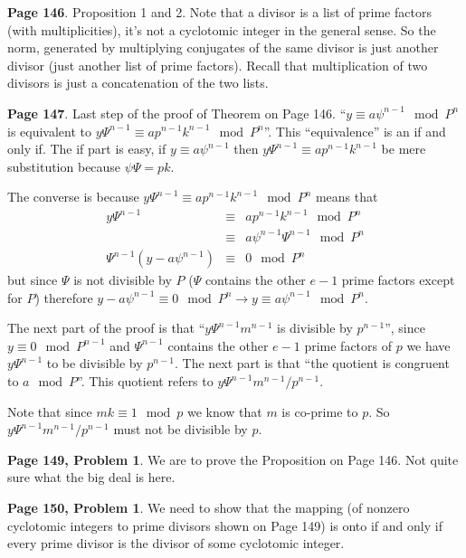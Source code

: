 \documentclass[aps,preprint,preprintnumbers,nofootinbib,showpacs,prd]{revtex4-1}
\newcommand{\nbea}{\begin{eqnarray*}}
\newcommand{\neea}{\end{eqnarray*}}
\begin{document}
{\bf Page 146}. Proposition 1 and 2. Note that a divisor is a list of prime factors (with multiplicities), it's not a cyclotomic integer in the general sense. So the norm, generated by multiplying conjugates of the same divisor is just another divisor (just another list of prime factors). Recall that multiplication of two divisors is just a concatenation of the two lists.


{\bf Page 147}. Last step of the proof of Theorem on Page 146. ``$y \equiv a\psi^{n-1} \mod P^n$ is equivalent to $y\Psi^{n-1} \equiv ap^{n-1}k^{n-1} \mod P^n$''. This ``equivalence'' is an if and only if. The if part is easy, if $y \equiv a\psi^{n-1}$ then $y\Psi^{n-1} \equiv ap^{n-1}k^{n-1}$ be mere substitution because $\psi\Psi = pk$.

The converse is because $y\Psi^{n-1} \equiv ap^{n-1}k^{n-1} \mod P^n$ means that 
%
\nbea
y\Psi^{n-1} & \equiv & ap^{n-1}k^{n-1} \mod P^n \\
& \equiv & a\psi^{n-1}\Psi^{n-1} \mod P^n \\
\Psi^{n-1}(y - a\psi^{n-1}) & \equiv & 0 \mod P^n
\neea
%
but since $\Psi$ is not divisible by $P$ ($\Psi$ contains the other $e - 1$ prime factors except for $P$) therefore $y - a\psi^{n-1} \equiv 0 \mod P^n \to y \equiv a\psi^{n-1} \mod P^n$.

The next part of the proof is that ``$y\Psi^{n-1}m^{n-1}$ is divisible by $p^{n-1}$'', since $y \equiv 0 \mod P^{n-1}$ and $\Psi^{n-1}$ contains the other $e - 1$ prime factors of $p$ we have $y\Psi^{n-1}$ to be divisible by $p^{n-1}$. The next part is that ``the quotient is congruent to $a \mod P$''. This quotient refers to $y\Psi^{n-1}m^{n-1}/p^{n-1}$.

Note that since $mk \equiv 1 \mod p$ we know that $m$ is co-prime to $p$. So $y\Psi^{n-1}m^{n-1}/p^{n-1}$ must not be divisible by $p$.



{\bf Page 149, Problem 1}. We are to prove the Proposition on Page 146. Not quite sure what the big deal is here. 













{\bf Page 150, Problem 1}. We need to show that the mapping (of nonzero cyclotomic integers to prime divisors shown on Page 149) is onto if and only if every prime divisor is the divisor of some cyclotomic integer.
\end{document}
